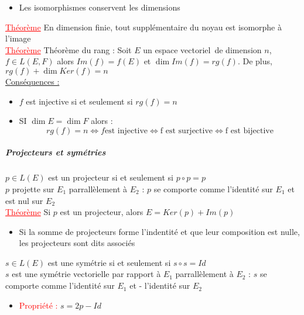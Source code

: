 \documentclass[a4paper, 11pt, french]{article}
\newcommand{\ev}{espace vectoriel}
\newcommand{\thm}{\textcolor{red}{\underline{Théorème} }}
\newcommand{\ppt}{\textcolor{red}{Propriété : }}
\begin{document}
	\begin{itemize}
	  \item Les isomorphismes conservent les dimensions
	\end{itemize}
	 \thm En dimension finie, tout supplémentaire du noyau est isomorphe à l'image \\
	 \thm Théorème du rang : Soit $E$ un \ev \, de dimension $n$, $f\in L(E,F)$ alors $Im(f)=f(E)$ et $\dim Im(f)=rg(f)$. De plus, $rg(f)+\dim Ker(f)=n$ \\
	 \underline{Conséquences :}
	\begin{itemize}
 		\item $f$ est injective si et seulement si $rg(f)=n$
 		\item SI $\dim E = \dim F$ alors :
				 $$rg(f)=n \iff f \text{est injective} \iff \text{f est surjective} \iff \text{f est bijective}$$
	\end{itemize}
	\subparagraph*{Projecteurs et symétries \\}
	$p \in L(E)$ est un projecteur si et seulement si $p\circ p=p$ \\
	$p$ projette sur $E_1$ parrallèlement à $E_2$ : $p$ se comporte comme l'identité sur $E_1$ et est nul sur $E_2$ \\
	 \thm Si $p$ est un projecteur, alors $E=Ker(p)+Im(p)$
	\begin{itemize}
 		\item Si la somme de projecteurs forme l'indentité et que leur composition est nulle, les projecteurs sont dits associés
	\end{itemize}
	$s \in L(E)$ est une symétrie si et seulement si $s\circ s=Id$ \\
	$s$ est une symétrie vectorielle par rapport à $E_1$ parrallèlement à $E_2$ : $s$ se comporte comme l'identité sur $E_1$ et - l'identité sur $E_2$ \\
	\begin{itemize}
 		\item\ppt $s=2p-Id$
	\end{itemize}
\end{document}

